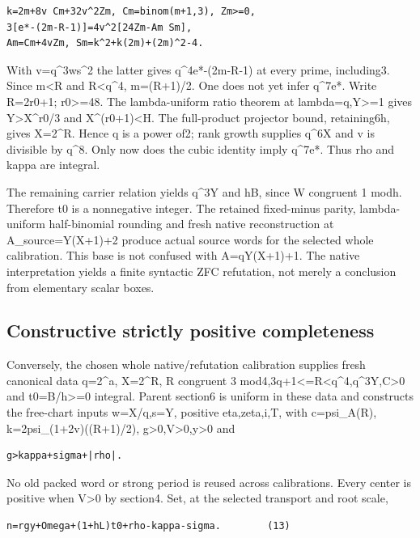 \begin{verbatim}
k=2m+8v Cm+32v^2Zm, Cm=binom(m+1,3), Zm>=0,
3[e*-(2m-R-1)]=4v^2[24Zm-Am Sm],
Am=Cm+4vZm, Sm=k^2+k(2m)+(2m)^2-4.
\end{verbatim}

With v=q\^{}3ws\^{}2 the latter gives q\^{}4\textbar e*-(2m-R-1) at
every prime, including3. Since m\textless R and R\textless q\^{}4,
m=(R+1)/2. One does not yet infer q\^{}7\textbar e*. Write R=2r0+1;
r0\textgreater=48. The lambda-uniform ratio theorem at
lambda=q,Y\textgreater=1 gives Y\textgreater X\^{}r0/3 and
X\^{}(r0+1)\textless H. The full-product projector bound, retaining6h,
gives X=2\^{}R. Hence q is a power of2; rank growth supplies
q\^{}6\textbar X and v is divisible by q\^{}8. Only now does the cubic
identity imply q\^{}7\textbar e*. Thus rho and kappa are integral.

The remaining carrier relation yields q\^{}3\textbar Y and h\textbar B,
since W congruent 1 modh. Therefore t0 is a nonnegative integer. The
retained fixed-minus parity, lambda-uniform half-binomial rounding and
fresh native reconstruction at A\_source=Y(X+1)+2 produce actual source
words for the selected whole calibration. This base is not confused with
A=qY(X+1)+1. The native interpretation yields a finite syntactic ZFC
refutation, not merely a conclusion from elementary scalar boxes.

\subsection{Constructive strictly positive
completeness}\label{constructive-strictly-positive-completeness}

Conversely, the chosen whole native/refutation calibration supplies
fresh canonical data q=2\^{}a, X=2\^{}R, R congruent 3
mod4,3q+1\textless=R\textless q\^{}4,q\^{}3\textbar Y,C\textgreater0 and
t0=B/h\textgreater=0 integral. Parent section6 is uniform in these data
and constructs the free-chart inputs w=X/q,s=Y, positive eta,zeta,i,T,
with c=psi\_A(R), k=2psi\_(1+2v)((R+1)/2),
g\textgreater0,V\textgreater0,y\textgreater0 and

\begin{verbatim}
g>kappa+sigma+|rho|.
\end{verbatim}

No old packed word or strong period is reused across calibrations. Every
center is positive when V\textgreater0 by section4. Set, at the selected
transport and root scale,

\begin{verbatim}
n=rgy+Omega+(1+hL)t0+rho-kappa-sigma.        (13)
\end{verbatim}

